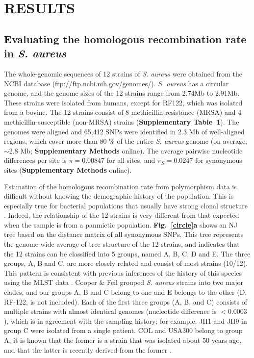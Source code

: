 \documentclass[twoside,twocolumn, letterpaper]{article}
\begin{document}
\section*{RESULTS}
\subsection*{Evaluating the homologous recombination rate in \emph{S. aureus}}
The whole-genomic sequences of 12 strains of \emph{S. aureus} were obtained from the NCBI database (ftp://ftp.ncbi.nih.gov/genomes/). \emph{S. aureus} has a circular genome, and the genome sizes of the 12 strains range from 2.74Mb to 2.91Mb. These strains were isolated from humans, except for RF122, which was isolated from a bovine. The 12 strains consist of 8 methicillin-resistance (MRSA) and 4 methicillin-susceptible (non-MRSA) strains ({\bf Supplementary Table~1}). The genomes were aligned and 65,412 SNPs were identified in 2.3 Mb of well-aligned regions, which cover more than 80 \% of the entire \emph{S. aureus} genome (on average, $\sim$2.8 Mb; {\bf Supplementary Methods} online). The average pairwise nucleotide differences per site is $\pi=0.00847$ for all sites, and $\pi_S=0.0247$ for synonymous sites ({\bf Supplementary Methods} online).

Estimation of the homologous recombination rate from polymorphism data is difficult without knowing the demographic history of the population. This is especially true for bacterial populations that usually have strong clonal structure \cite[]{Selander_1980_56,Orskov_1983,Hartl_1984_47,Smith_1993_8506277}. Indeed, the relationship of the 12 strains is very different from that expected when the sample is from a panmictic population. {\bf Fig.~\ref{circle}a} shows an NJ tree based on the distance matrix of all synonymous SNPs. This tree represents the genome-wide average of tree structure of the 12 strains, and indicates that the 12 strains can be classified into 5 groups, named A, B, C, D and E. The three groups, A, B and C, are more closely related and consist of most strains (10/12). 
This pattern is consistent with previous inferences of the history of this species using the MLST data \cite[]{Feil_2003_12754228,Cooper_2006_16622047}. Cooper \& Feil \cite[]{Cooper_2006_16622047} grouped \emph{S. aureus} strains into two major clades, and our groups A, B and C belong to one and E belongs to the other (D, RF-122, is not included). 
Each of the first three groups (A, B, and C) consists of multiple strains with almost identical genomes (nucleotide difference is $< 0.0003 $), which is in agreement with the sampling history; for example, JH1 and JH9 in group C were isolated from a single patient. COL and USA300 belong to group A; it is known that the former is a strain that was isolated about 50 years ago, and that the latter is recently derived from the former \cite[]{Diep_2006_16517273}.
\end{document}
